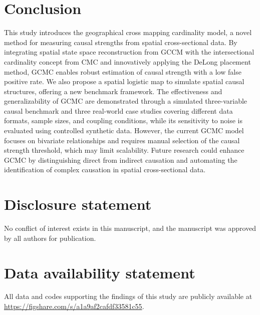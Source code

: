 \documentclass[authoryear,preprint,review,12pt]{elsarticle}
\begin{document}
\section{Conclusion}\label{sec5} 

This study introduces the geographical cross mapping cardinality model, a novel method for measuring causal strengths from spatial cross-sectional data. By integrating spatial state space reconstruction from GCCM with the intersectional cardinality concept from CMC and innovatively applying the DeLong placement method, GCMC enables robust estimation of causal strength with a low false positive rate. We also propose a spatial logistic map to simulate spatial causal structures, offering a new benchmark framework. The effectiveness and generalizability of GCMC are demonstrated through a simulated three-variable causal benchmark and three real-world case studies covering different data formats, sample sizes, and coupling conditions, while its sensitivity to noise is evaluated using controlled synthetic data. However, the current GCMC model focuses on bivariate relationships and requires manual selection of the causal strength threshold, which may limit scalability. Future research could enhance GCMC by distinguishing direct from indirect causation and automating the identification of complex causation in spatial cross-sectional data.

\section*{Disclosure statement}

No conflict of interest exists in this manuscript, and the manuscript was approved by all authors for publication.

\section*{Data availability statement}

All data and codes supporting the findings of this study are publicly available at \\
\url{https://figshare.com/s/a1a9af2cafdf33581c55}. 

\end{document}
